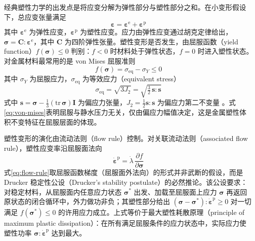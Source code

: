 经典塑性力学的出发点是将应变分解为弹性部分与塑性部分之和。在小变形假设下，总应变张量满足
\begin{equation}
  \boldsymbol{\varepsilon}=\boldsymbol{\varepsilon}^{\mathrm{e}}+\boldsymbol{\varepsilon}^{\mathrm{p}}
  \label{eq:strain-decomposition}
\end{equation}
其中 $\boldsymbol{\varepsilon}^{\mathrm{e}}$ 为弹性应变，$\boldsymbol{\varepsilon}^{\mathrm{p}}$ 为塑性应变。应力由弹性应变通过胡克定律给出，$\boldsymbol{\sigma}=\mathbf{C}:\boldsymbol{\varepsilon}^{\mathrm{e}}$，其中 $\mathbf{C}$ 为四阶弹性张量。塑性变形是否发生，由屈服函数（yield function）$f(\boldsymbol{\sigma})\le 0$ 判别：$f<0$ 时材料处于弹性状态，$f=0$ 时进入塑性状态。对金属材料最常用的是 von Mises 屈服准则
\begin{equation}
  f(\boldsymbol{\sigma})=\sigma_{\mathrm{eq}}-\sigma_{Y}\le 0
  \label{eq:von-mises}
\end{equation}
其中 $\sigma_{Y}$ 为屈服应力，$\sigma_{\mathrm{eq}}$ 为等效应力（equivalent stress）
\begin{equation}
  \sigma_{\mathrm{eq}}=\sqrt{3J_{2}}=\sqrt{\tfrac{3}{2}\,\mathbf{s}:\mathbf{s}}
  \label{eq:equivalent-stress}
\end{equation}
式中 $\mathbf{s}=\boldsymbol{\sigma}-\tfrac{1}{3}(\mathrm{tr}\,\boldsymbol{\sigma})\mathbf{I}$ 为偏应力张量，$J_{2}=\tfrac{1}{2}\mathbf{s}:\mathbf{s}$ 为偏应力第二不变量 \cite{Hill1950}。式\eqref{eq:von-mises}表明屈服与静水压力无关，仅由偏应力幅值决定，这是金属塑性体积不变特征在屈服层面的体现。

塑性变形的演化由流动法则（flow rule）控制。对关联流动法则（associated flow rule），塑性应变率沿屈服面法向
\begin{equation}
  \dot{\boldsymbol{\varepsilon}}^{\mathrm{p}}=\dot{\lambda}\,\frac{\partial f}{\partial\boldsymbol{\sigma}}
  \label{eq:flow-rule}
\end{equation}
式\eqref{eq:flow-rule}取屈服函数梯度（屈服面外法向）的形式并非武断的假设，而是 Drucker 稳定性公设（Drucker's stability postulate）的必然推论。该公设要求：对稳定材料，从屈服面内任意应力状态 $\boldsymbol{\sigma}^{*}$ 出发、加载至屈服面上应力 $\boldsymbol{\sigma}$ 再返回原状态的闭合循环中，外力做功非负；其塑性部分给出 $(\boldsymbol{\sigma}-\boldsymbol{\sigma}^{*}):\dot{\boldsymbol{\varepsilon}}^{\mathrm{p}}\ge 0$ 对一切满足 $f(\boldsymbol{\sigma}^{*})\le 0$ 的许用应力成立。上式等价于最大塑性耗散原理（principle of maximum plastic dissipation）：在所有满足屈服条件的应力状态中，实际应力使塑性功率 $\boldsymbol{\sigma}:\dot{\boldsymbol{\varepsilon}}^{\mathrm{p}}$ 达到最大。

